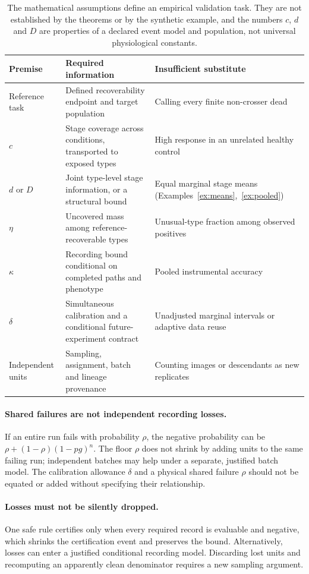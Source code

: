 \documentclass[11pt]{article}
\theoremstyle{definition}
\theoremstyle{remark}
\begin{document}
\begin{table}[ht]
\centering\small
\begin{tabularx}{\linewidth}{@{}l Y Y@{}}
\toprule
Premise & Required information & Insufficient substitute\\
\midrule
Reference task & Defined recoverability endpoint and target population &
Calling every finite non-crosser dead\\
$c$ & Stage coverage across conditions, transported to exposed types &
High response in an unrelated healthy control\\
$d$ or $D$ & Joint type-level stage information, or a structural bound &
Equal marginal stage means (Examples~\ref{ex:means},~\ref{ex:pooled})\\
$\eta$ & Uncovered mass among reference-recoverable types &
Unusual-type fraction among observed positives\\
$\kappa$ & Recording bound conditional on completed paths and phenotype &
Pooled instrumental accuracy\\
$\delta$ & Simultaneous calibration and a conditional future-experiment contract &
Unadjusted marginal intervals or adaptive data reuse\\
Independent units & Sampling, assignment, batch and lineage provenance &
Counting images or descendants as new replicates\\
\bottomrule
\end{tabularx}
\caption{The mathematical assumptions define an empirical validation task. They
are not established by the theorems or by the synthetic example, and the numbers
$c$, $d$ and $D$ are properties of a declared event model and population, not
universal physiological constants.}
\label{tab:calibration}
\end{table}

\paragraph{Shared failures are not independent recording losses.}
If an entire run fails with probability $\rho$, the negative probability can be
$\rho+(1-\rho)(1-pg)^n$. The floor $\rho$ does not shrink by adding units to the
same failing run; independent batches may help under a separate, justified batch
model. The calibration allowance $\delta$ and a physical shared failure $\rho$
should not be equated or added without specifying their relationship.

\paragraph{Losses must not be silently dropped.}
One safe rule certifies only when every required record is evaluable and
negative, which shrinks the certification event and preserves the bound.
Alternatively, losses can enter a justified conditional recording model.
Discarding lost units and recomputing an apparently clean denominator requires a
new sampling argument.
\end{document}
